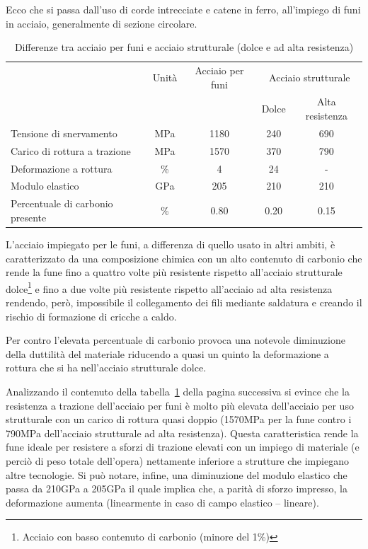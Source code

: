 Ecco che si passa dall'uso di corde intrecciate e catene in ferro, all'impiego di funi in acciaio, generalmente di sezione circolare.

{\small
\begin{table}
	\centering
	\caption{Differenze tra acciaio per funi e acciaio strutturale (dolce e ad alta resistenza)\cite{gimsing:cable}}
	\label{tab:acciaio_differenze}
	\begin{tabular}{p{}cccc}
		\toprule
		&Unità&Acciaio per funi&\multicolumn{2}{c}{Acciaio strutturale}\\
		&&&Dolce&Alta resistenza\\
		\midrule
		Tensione di snervamento&\si{MPa}&\num{1180}&\num{240}&\num{690}\\
		Carico di rottura a trazione&\si{MPa}&\num{1570}&\num{370}&\num{790}\\
		Deformazione a rottura&\%&\num{4}&\num{24}&-\\
		Modulo elastico&\si{GPa}&\num{205}&\num{210}&\num{210}\\
		Percentuale di carbonio presente&\%&\num{0.80}&\num{0.20}&\num{0.15}\\
		\bottomrule
	\end{tabular}
\end{table}
}

L'acciaio impiegato per le funi, a differenza di quello usato in altri ambiti, è caratterizzato da una composizione chimica con un alto contenuto di carbonio che rende la fune fino a quattro volte più resistente rispetto all'acciaio strutturale dolce\footnote{Acciaio con basso contenuto di carbonio (minore del 1\%)\cite{sito:ravaniacciai}} e fino a due volte più resistente rispetto all'acciaio ad alta resistenza rendendo, però, impossibile il collegamento dei fili mediante saldatura e creando il rischio di formazione di cricche a caldo.  

Per contro l'elevata percentuale di carbonio provoca una notevole diminuzione della duttilità del materiale riducendo a quasi un quinto la deformazione a rottura che si ha nell'acciaio strutturale dolce.

Analizzando il contenuto della tabella~\ref{tab:acciaio_differenze} della pagina successiva si evince che la resistenza a trazione dell'acciaio per funi è molto più elevata dell'acciaio per uso strutturale con un carico di rottura quasi doppio (\num{1570}\si{MPa} per la fune contro i \num{790}\si{MPa} dell'acciaio strutturale ad alta resistenza). Questa caratteristica rende la fune ideale per resistere a sforzi di trazione elevati con un impiego di materiale (e perciò di peso totale dell'opera) nettamente inferiore a strutture che impiegano altre tecnologie.
Si può notare, infine, una diminuzione del modulo elastico che passa da \num{210}\si{GPa} a \num{205}\si{GPa} il quale implica che, a parità di sforzo impresso, la deformazione aumenta (linearmente in caso di campo elastico -- lineare).

